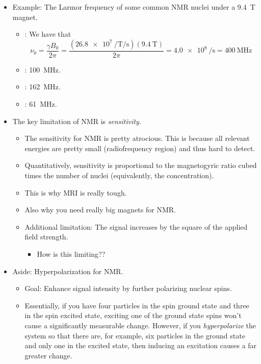 \documentclass[../notes.tex]{subfiles}
\begin{document}
\begin{itemize}
\begin{itemize}
    \end{itemize}
    \item Example: The Larmor frequency of some common NMR nuclei under a \SI{9.4}{\tesla} magnet.
    \begin{itemize}
        \item {}: We have that
        \begin{equation*}
            \nu_0 = \frac{\gamma B_0}{2\pi}
            = \frac{(\SI{26.8e7}{\per\tesla\per\second})(\SI{9.4}{\tesla})}{2\pi}
            = \SI{4.0e8}{\per\second}
            = \SI{400}{\mega\hertz}
        \end{equation*}
        \item {}: \SI{100}{\mega\hertz}.
        \item {}: \SI{162}{\mega\hertz}.
        \item {}: \SI{61}{\mega\hertz}.
    \end{itemize}
    \item The key limitation of NMR is \emph{sensitivity}.
    \begin{itemize}
        \item The sensitivity for NMR is pretty atrocious. This is because all relevant energies are pretty small (radiofrequency region) and thus hard to detect.
        \item Quantitatively, sensitivity is proportional to the magnetogyric ratio cubed times the number of nuclei (equivalently, the concentration).
        \item This is why MRI is really tough.
        \item Also why you need really big magnets for NMR.
        \item Additional limitation: The signal increases by the square of the applied field strength.
        \begin{itemize}
            \item How is this limiting??
        \end{itemize}
    \end{itemize}
    \item Aside: Hyperpolarization for NMR.
    \begin{itemize}
        \item Goal: Enhance signal intensity by further polarizing nuclear spins.
        \item Essentially, if you have four particles in the spin ground state and three in the spin excited state, exciting one of the ground state spins won't cause a significantly measurable change. However, if you \emph{hyperpolarize} the system so that there are, for example, six particles in the ground state and only one in the excited state, then inducing an excitation causes a far greater change.

\end{itemize}
\end{itemize}
\end{document}
